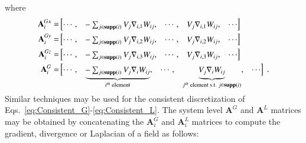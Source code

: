 \documentclass[final,3p,times]{elsarticle}
\begin{document}
where 
 \begin{align}\renewcommand{\arraystretch}{1.2}
 \mathbf{A}^{Gx}_i=& \begin{bmatrix}
 \cdots, & 
 \smash[b]{\begin{matrix}-\sum_{j \in \support{i}} V_j \nabla_{i,1} W_{ij} \end{matrix} },
 &\cdots, &\smash[b]{{\begin{matrix}V_j \nabla_{i,1} W_{ij}\end{matrix}}}, & \cdots
 \end{bmatrix}\\
 \mathbf{A}^{Gy}_i=& \begin{bmatrix}
 \cdots, & 
 \smash[b]{\begin{matrix}-\sum_{j \in \support{i}} V_j \nabla_{i,2} W_{ij} \end{matrix} },
 &\cdots, &\smash[b]{{\begin{matrix}V_j \nabla_{i,2} W_{ij}\end{matrix}}}, & \cdots
 \end{bmatrix}\\
 \mathbf{A}^{Gz}_i=& \begin{bmatrix}
 \cdots, & 
 \smash[b]{\begin{matrix}-\sum_{j \in \support{i}} V_j \nabla_{i,3} W_{ij} \end{matrix} },
 &\cdots, &\smash[b]{{\begin{matrix}V_j \nabla_{i,3} W_{ij}\end{matrix}}}, & \cdots
 \end{bmatrix}\\
 \mathbf{A}^{G}_i=& \begin{bmatrix}
 \cdots, & 
 \smash[b]{\underbrace{\begin{matrix}-\sum_{j \in \support{i}} V_j \nabla_i W_{ij} \end{matrix}}_{i^{th}\text{ element} }} ,
 &\cdots, &\smash[b]{\underbrace{\begin{matrix}V_j \nabla_i W_{ij}\end{matrix}}_{j^{th}\text{ element s.t. }{j \in \support{i}} }}, & \cdots
 \end{bmatrix}\label{eq:AGMat} \; .
\end{align}
\\
Similar techniques may be used for the consistent discretization of  Eqs.~\eqref{eq:Consistent_G}-\eqref{eq:Consistent_L}.
The system level $\mathbf{A}^G$ and $\mathbf{A}^L$ matrices may be obtained by concatenating the $\mathbf{A}^G_i$ and $\mathbf{A}^L_i$ matrices to compute the gradient, divergence or Laplacian of a field as follows:
\end{document}
